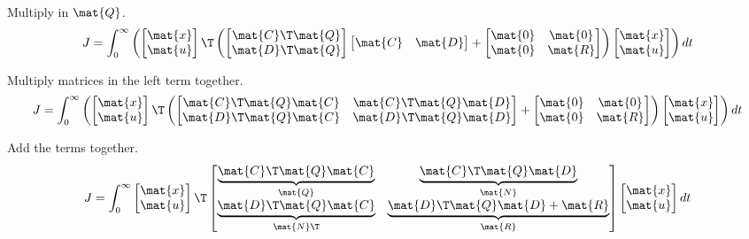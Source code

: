 Multiply in $\mat{Q}$.
\begin{equation*}
  J = \int_0^\infty \left(
    \begin{bmatrix}
      \mat{x} \\
      \mat{u}
    \end{bmatrix}\T
    \left(
    \begin{bmatrix}
      \mat{C}\T\mat{Q} \\
      \mat{D}\T\mat{Q}
    \end{bmatrix}
    \begin{bmatrix}
      \mat{C} &
      \mat{D}
    \end{bmatrix} +
    \begin{bmatrix}
      \mat{0} & \mat{0} \\
      \mat{0} & \mat{R}
    \end{bmatrix}
    \right)
    \begin{bmatrix}
      \mat{x} \\
      \mat{u}
    \end{bmatrix}
    \right) dt
\end{equation*}

Multiply matrices in the left term together.
\begin{equation*}
  J = \int_0^\infty \left(
    \begin{bmatrix}
      \mat{x} \\
      \mat{u}
    \end{bmatrix}\T
    \left(
    \begin{bmatrix}
      \mat{C}\T\mat{Q}\mat{C} & \mat{C}\T\mat{Q}\mat{D} \\
      \mat{D}\T\mat{Q}\mat{C} & \mat{D}\T\mat{Q}\mat{D}
    \end{bmatrix} +
    \begin{bmatrix}
      \mat{0} & \mat{0} \\
      \mat{0} & \mat{R}
    \end{bmatrix}
    \right)
    \begin{bmatrix}
      \mat{x} \\
      \mat{u}
    \end{bmatrix}
    \right) dt
\end{equation*}

Add the terms together.
\begin{equation}
  J = \int_0^\infty
  \begin{bmatrix}
    \mat{x} \\
    \mat{u}
  \end{bmatrix}\T
  \begin{bmatrix}
    \underbrace{\mat{C}\T\mat{Q}\mat{C}}_{\mat{Q}} &
    \underbrace{\mat{C}\T\mat{Q}\mat{D}}_{\mat{N}} \\
    \underbrace{\mat{D}\T\mat{Q}\mat{C}}_{\mat{N}\T} &
    \underbrace{\mat{D}\T\mat{Q}\mat{D} + \mat{R}}_{\mat{R}}
  \end{bmatrix}
  \begin{bmatrix}
    \mat{x} \\
    \mat{u}
  \end{bmatrix}
  dt
\end{equation}

